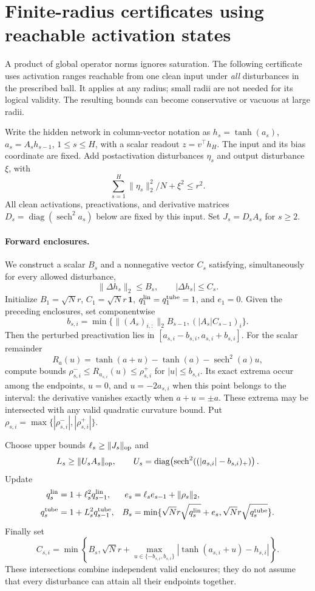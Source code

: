 \section{Finite-radius certificates using reachable activation states}
\label{sec:reachable-tube}

A product of global operator norms ignores saturation. The following
certificate uses activation ranges reachable from one clean input under
\emph{all} disturbances in the prescribed ball. It applies at any radius;
small radii are not needed for its logical validity. The resulting bounds
can become conservative or vacuous at large radii.

Write the hidden network in column-vector notation as
$h_s=\tanh(a_s)$, $a_s=A_sh_{s-1}$, $1\le s\le H$, with a scalar readout
$z=v^\top h_H$. The input and its bias coordinate are fixed. Add
postactivation disturbances $\eta_s$ and output disturbance $\xi$, with
\[
 \sum_{s=1}^H\|\eta_s\|_2^2/N+\xi^2\le r^2.
\]
All clean activations, preactivations, and derivative matrices
$D_s=\operatorname{diag}(\operatorname{sech}^2a_s)$ below are fixed by this
input. Set $J_s=D_sA_s$ for $s\ge2$.

\paragraph{Forward enclosures.}
We construct a scalar $B_s$ and a nonnegative vector $C_s$ satisfying,
simultaneously for every allowed disturbance,
\[
 \|\Delta h_s\|_2\le B_s,\qquad |\Delta h_s|\le C_s.
\]
Initialize
$B_1=\sqrt N r$, $C_1=\sqrt N r\,\boldsymbol1$,
$q_1^{\rm lin}=q_1^{\rm tube}=1$, and $e_1=0$.
Given the preceding enclosures, set componentwise
\[
 b_{s,i}=\min\{\|(A_s)_{i,:}\|_2 B_{s-1},
                        (|A_s|C_{s-1})_i\}.
\]
Then the perturbed preactivation lies in
$[a_{s,i}-b_{s,i},a_{s,i}+b_{s,i}]$.
For the scalar remainder
\[
 R_a(u)=\tanh(a+u)-\tanh(a)-\operatorname{sech}^2(a)u,
\]
compute bounds $\rho^-_{s,i}\le R_{a_{s,i}}(u)\le\rho^+_{s,i}$ for
$|u|\le b_{s,i}$. Its exact extrema occur among the endpoints, $u=0$,
and $u=-2a_{s,i}$ when this point belongs to the interval: the derivative
vanishes exactly when $a+u=\pm a$. These extrema may be intersected with
any valid quadratic curvature bound. Put
$\rho_{s,i}=\max\{|\rho^-_{s,i}|,|\rho^+_{s,i}|\}$.

Choose upper bounds $\ell_s\ge\|J_s\|_{\rm op}$ and
\[
 L_s\ge\|U_sA_s\|_{\rm op},\qquad
 U_s=\operatorname{diag}\!\left(
  \operatorname{sech}^2((|a_{s,i}|-b_{s,i})_+)\right).
\]
Update
\begin{align*}
 q_s^{\rm lin}&=1+\ell_s^2q_{s-1}^{\rm lin},&
 e_s&=\ell_se_{s-1}+\|\rho_s\|_2,\\
 q_s^{\rm tube}&=1+L_s^2q_{s-1}^{\rm tube},&
 B_s&=\min\{\sqrt N r\sqrt{q_s^{\rm lin}}+e_s,
                    \sqrt N r\sqrt{q_s^{\rm tube}}\}.
\end{align*}
Finally set
\[
 C_{s,i}=\min\!\left\{B_s,\sqrt N r+
   \max_{u\in\{-b_{s,i},b_{s,i}\}}
          |\tanh(a_{s,i}+u)-h_{s,i}|\right\}.
\]
These intersections combine independent valid enclosures; they do not
assume that every disturbance can attain all their endpoints together.


